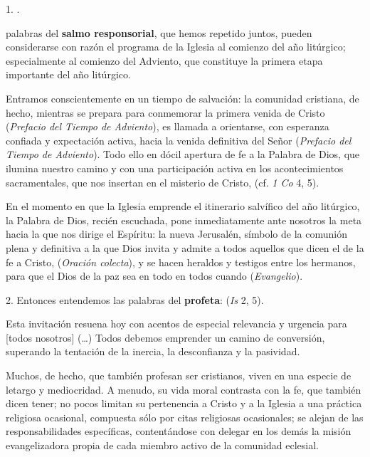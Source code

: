 \begin{body}
	1. . 
	
	 palabras del \textbf{salmo responsorial}, que hemos repetido juntos, pueden considerarse con razón el programa de la Iglesia al comienzo del año litúrgico; especialmente al comienzo del Adviento, que constituye la primera etapa importante del año litúrgico. 
	
	Entramos conscientemente en un tiempo  de salvación: la comunidad cristiana, de hecho, mientras se prepara para conmemorar la primera venida de Cristo  (\emph{Prefacio del Tiempo de Adviento}), es llamada a orientarse, con esperanza confiada y expectación activa, hacia la venida definitiva del Señor  (\emph{Prefacio del Tiempo de Adviento}). Todo ello en dócil apertura de fe a la Palabra de Dios, que ilumina nuestro camino y con una participación activa en los acontecimientos sacramentales, que nos insertan en el misterio de Cristo,  (cf. \emph{1 Co} 4, 5). 
	
	En el momento en que la Iglesia emprende el itinerario salvífico del año litúrgico, la Palabra de Dios, recién escuchada, pone inmediatamente ante nosotros la meta hacia la que nos dirige el Espíritu: la nueva Jerusalén, símbolo de la comunión plena y definitiva a la que Dios invita y admite a todos aquellos que dicen el  de la fe a Cristo,  (\emph{Oración colecta}), y se hacen heraldos y testigos entre los hermanos, para que el Dios de la paz sea en todo en todos cuando  (\emph{Evangelio}). 
	
	2. Entonces entendemos las palabras del \textbf{profeta}:  (\emph{Is} 2, 5). 
	
	Esta invitación resuena hoy con acentos de especial relevancia y urgencia para {[}todos nosotros{]} (\ldots{}) Todos debemos emprender un camino de conversión, superando la tentación de la inercia, la desconfianza y la pasividad. 
	
	Muchos, de hecho, que también profesan ser cristianos, viven en una especie de letargo y mediocridad. A menudo, su vida moral contrasta con la fe, que también dicen tener; no pocos limitan su pertenencia a Cristo y a la Iglesia a una práctica religiosa ocasional, compuesta sólo por citas religiosas ocasionales; se alejan de las responsabilidades específicas, contentándose con delegar en los demás la misión evangelizadora propia de cada miembro activo de la comunidad eclesial. 
	

\end{body}
